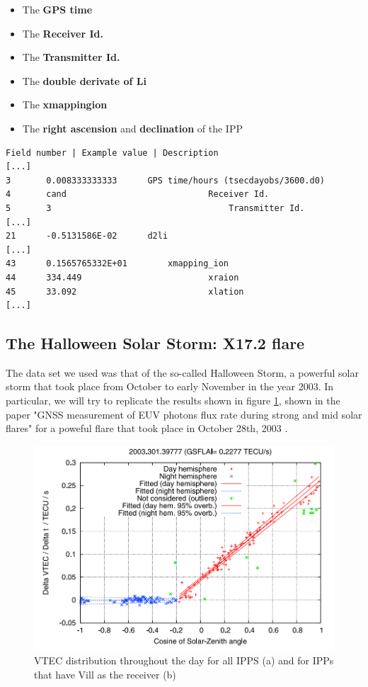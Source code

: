 \begin{itemize}
\item The \textbf{GPS time}
\item The \textbf{Receiver Id.}
\item The \textbf{Transmitter Id.}
\item The \textbf{double derivate of Li}
\item The \textbf{xmappingion}
\item The \textbf{right ascension} and \textbf{declination} of the IPP
\end{itemize}

\begin{lstlisting}[caption=Format of the ti file]
Field number | Example value | Description
[...]
3 		0.008333333333		GPS time/hours (tsecdayobs/3600.d0)
4 		cand							Receiver Id.
5 		3									Transmitter Id.
[...]
21 		-0.5131586E-02		d2li
[...]
43 		0.1565765332E+01		xmapping_ion
44 		334.449							xraion
45 		33.092							xlation
[...]
\end{lstlisting}

\subsection{The Halloween Solar Storm: X17.2 flare}

The data set we used was that of the so-called Halloween Storm, a powerful solar storm that took place from October to early November in the year 2003. In particular, we will try to replicate the results shown in figure \ref{fig:halloweenPaper}, shown in the paper "GNSS measurement of EUV photons flux rate during strong and mid solar flares" for a poweful flare that took place in October 28th, 2003 \cite{hernandez2012gnss}.

\begin{figure}[!htb]
	\begin{centering}
		\includegraphics[width=0.5\linewidth]{images/ch4/halloweenPaper.png}
		\caption{VTEC distribution throughout the day for all IPPS (a) and for IPPs that have Vill as the receiver (b)}
		\label{fig:halloweenPaper}
	\end{centering}
\end{figure}

